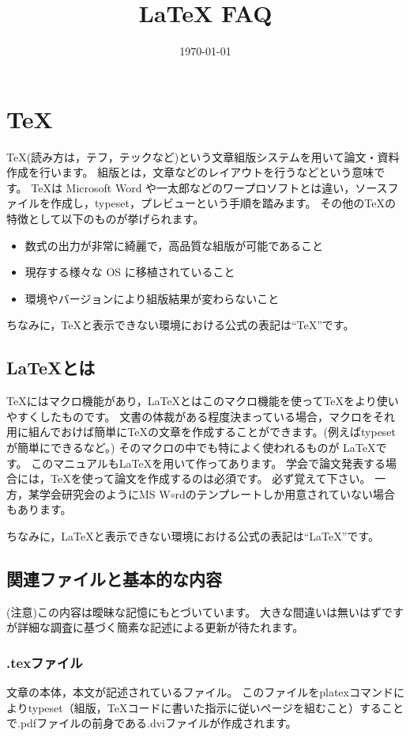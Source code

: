 \documentclass[10pt,a4paper,oneside,twocolumn,fleqn,dvipdfmx]{jsarticle}
\title{{\LaTeX} FAQ}
\author{}
\date{\today}
\begin{document}
\maketitle

\section{\TeX}
\TeX (読み方は，テフ，テックなど)という文章組版システムを用いて論文・資料作成を行います。
組版とは，文章などのレイアウトを行うなどという意味です。
\TeX は Microsoft Word や一太郎などのワープロソフトとは違い，ソースファイルを作成し，typeset，プレビューという手順を踏みます。
その他の\TeX の特徴として以下のものが挙げられます。

\begin{itemize}
	\item  数式の出力が非常に綺麗で，高品質な組版が可能であること
	\item 現存する様々な OS に移植されていること
	\item 環境やバージョンにより組版結果が変わらないこと
\end{itemize}

ちなみに，\TeX と表示できない環境における公式の表記は``TeX''です。

\subsection{\LaTeX とは}
\TeX にはマクロ機能があり，\LaTeX とはこのマクロ機能を使って\TeX をより使いやすくしたものです。
文書の体裁がある程度決まっている場合，マクロをそれ用に組んでおけば簡単に\TeX の文章を作成することができます。(例えばtypesetが簡単にできるなど。)
そのマクロの中でも特によく使われるものが \LaTeX です。
このマニュアルも\LaTeX を用いて作ってあります。
学会で論文発表する場合には，\TeX を使って論文を作成するのは必須です。
必ず覚えて下さい。
一方，某学会研究会のようにMS W$\circ$rdのテンプレートしか用意されていない場合もあります。

ちなみに，\LaTeX と表示できない環境における公式の表記は``LaTeX''です。

\subsection{関連ファイルと基本的な内容}
(注意)この内容は曖昧な記憶にもとづいています。
大きな間違いは無いはずですが詳細な調査に基づく簡素な記述による更新が待たれます。

\subsubsection*{.texファイル}
文章の本体，本文が記述されているファイル。
このファイルをplatexコマンドによりtypeset（組版，\TeX コードに書いた指示に従いページを組むこと）することで.pdfファイルの前身である.dviファイルが作成されます。
\end{document}
